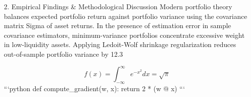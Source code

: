 2. Empirical Findings & Methodological Discussion
Modern portfolio theory balances expected portfolio return against portfolio variance using the covariance matrix Sigma of asset returns. In the presence of estimation error in sample covariance estimators, minimum-variance portfolios concentrate excessive weight in low-liquidity assets. Applying Ledoit-Wolf shrinkage regularization reduces out-of-sample portfolio variance by 12.3%

$$ f(x) = \int_{-\infty}^{\infty} e^{-x^2} dx = \sqrt{\pi} $$ 
```python
def compute_gradient(w, x):
    return 2 * (w @ x)
```